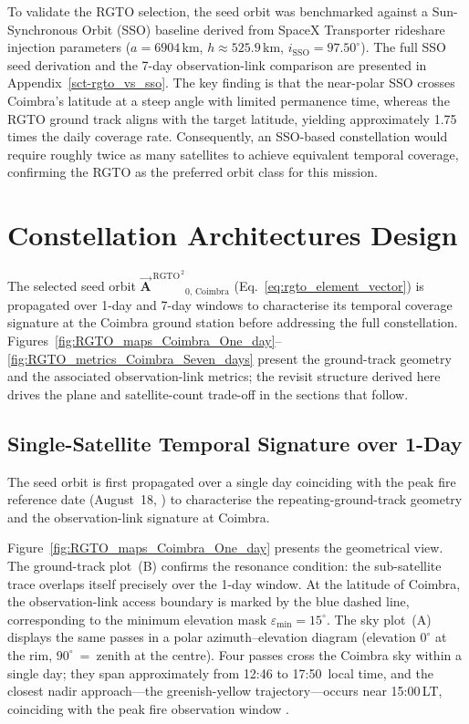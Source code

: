 To validate the RGTO selection, the seed orbit was benchmarked against a Sun-Synchronous Orbit (SSO) baseline derived from SpaceX Transporter rideshare injection parameters ($a = 6904$\,km, $h \approx 525.9$\,km, $i_{\mathrm{SSO}} = 97.50^{\circ}$).  The full SSO seed derivation and the 7-day observation-link comparison are presented in Appendix~\ref{sct-rgto_vs_sso}.  The key finding is that the near-polar SSO crosses Coimbra's latitude at a steep angle with limited permanence time, whereas the RGTO ground track aligns with the target latitude, yielding approximately 1.75 times the daily coverage rate.  Consequently, an SSO-based constellation would require roughly twice as many satellites to achieve equivalent temporal coverage, confirming the RGTO as the preferred orbit class for this mission.

\section{Constellation Architectures Design}\label{73-constellation-architectures-design}

The selected seed orbit $\vec{\mathbf{A}}^{\,\mathrm{RGTO}^{\,2}}{}_{0,\,\mathrm{Coimbra}}$ (Eq.~\eqref{eq:rgto_element_vector}) is propagated over 1-day and 7-day windows to characterise its temporal coverage signature at the Coimbra ground station before addressing the full constellation.  Figures~\ref{fig:RGTO_maps_Coimbra_One_day}--\ref{fig:RGTO_metrics_Coimbra_Seven_days} present the ground-track geometry and the associated observation-link metrics; the revisit structure derived here drives the plane and satellite-count trade-off in the sections that follow.

\subsection{Single-Satellite Temporal Signature over 1-Day}
\label{sec:seed_1day_propagation}

The seed orbit is first propagated over a single day coinciding with the peak fire reference date (August~18, ) to characterise the repeating-ground-track geometry and the observation-link signature at Coimbra.

Figure~\ref{fig:RGTO_maps_Coimbra_One_day} presents the geometrical view.  The ground-track plot~(B) confirms the resonance condition: the sub-satellite trace overlaps itself precisely over the 1-day window.  At the latitude of Coimbra, the observation-link access boundary is marked by the blue dashed line, corresponding to the minimum elevation mask $\varepsilon_{\min} = 15^{\circ}$.  The sky plot~(A) displays the same passes in a polar azimuth--elevation diagram (elevation $0^{\circ}$ at the rim, $90^{\circ}$~=~zenith at the centre).  Four passes cross the Coimbra sky within a single day; they span approximately from 12:46 to 17:50~local time, and the closest nadir approach---the greenish-yellow trajectory---occurs near 15:00\,LT, coinciding with the peak fire observation window .

